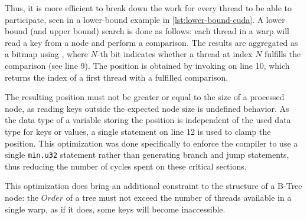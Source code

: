 Thus, it is more efficient to break down the work for every thread to be able to participate, seen in a lower-bound example in \cref{lst:lower-bound-cuda}. A lower bound (and upper bound) search is done as follows: each thread in a warp will read a key from a node and perform a comparison. The results are aggregated as a bitmap using , where $N$-th bit indicates whether a thread at index $N$ fulfills the comparison (see line 9). The position is obtained by invoking  on line 10, which returns the index of a first thread with a fulfilled comparison.

The resulting position must not be greater or equal to the size of a processed node, as reading keys outside the expected node size is undefined behavior. As the data type of a variable storing the position is independent of the used data type for keys or values, a single  statement on line 12 is used to clamp the position. This optimization was done specifically to enforce the compiler to use a single \texttt{min.u32} statement rather than generating branch and jump statements, thus reducing the number of cycles spent on these critical sections.

This optimization does bring an additional constraint to the structure of a B-Tree node: the $Order$ of a tree must not exceed the number of threads available in a single warp, as if it does, some keys will become inaccessible.
